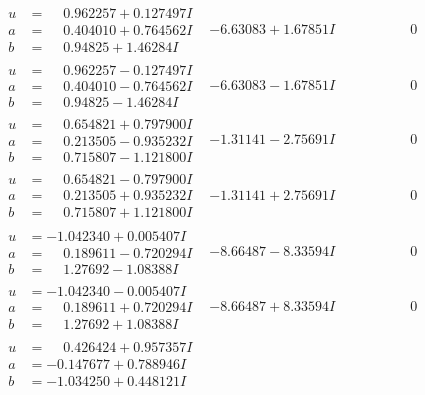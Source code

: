 \documentclass[1p]{elsarticle_modified}
\theoremstyle{definition}
\begin{document}
$$\begin{array}{c|c|c}
\begin{aligned}
u &= \phantom{-}0.962257 + 0.127497 I \\
a &= \phantom{-}0.404010 + 0.764562 I \\
b &= \phantom{-}0.94825 + 1.46284 I\end{aligned}
 & -6.63083 + 1.67851 I & \phantom{-0.000000 } 0 \\ \hline\begin{aligned}
u &= \phantom{-}0.962257 - 0.127497 I \\
a &= \phantom{-}0.404010 - 0.764562 I \\
b &= \phantom{-}0.94825 - 1.46284 I\end{aligned}
 & -6.63083 - 1.67851 I & \phantom{-0.000000 } 0 \\ \hline\begin{aligned}
u &= \phantom{-}0.654821 + 0.797900 I \\
a &= \phantom{-}0.213505 - 0.935232 I \\
b &= \phantom{-}0.715807 - 1.121800 I\end{aligned}
 & -1.31141 - 2.75691 I & \phantom{-0.000000 } 0 \\ \hline\begin{aligned}
u &= \phantom{-}0.654821 - 0.797900 I \\
a &= \phantom{-}0.213505 + 0.935232 I \\
b &= \phantom{-}0.715807 + 1.121800 I\end{aligned}
 & -1.31141 + 2.75691 I & \phantom{-0.000000 } 0 \\ \hline\begin{aligned}
u &= -1.042340 + 0.005407 I \\
a &= \phantom{-}0.189611 - 0.720294 I \\
b &= \phantom{-}1.27692 - 1.08388 I\end{aligned}
 & -8.66487 - 8.33594 I & \phantom{-0.000000 } 0 \\ \hline\begin{aligned}
u &= -1.042340 - 0.005407 I \\
a &= \phantom{-}0.189611 + 0.720294 I \\
b &= \phantom{-}1.27692 + 1.08388 I\end{aligned}
 & -8.66487 + 8.33594 I & \phantom{-0.000000 } 0 \\ \hline\begin{aligned}
u &= \phantom{-}0.426424 + 0.957357 I \\
a &= -0.147677 + 0.788946 I \\
b &= -1.034250 + 0.448121 I\end{aligned}

\end{array}$$
\end{document}
